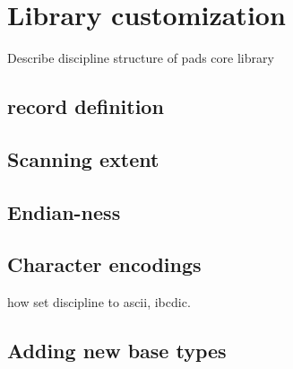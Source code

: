 \chapter{Library customization}
\label{chap:library-customization}
Describe discipline structure of pads core library
\section{record definition}

\section{Scanning extent}
\label{sec:library-customization-scanning-extent}

\section{Endian-ness}
\label{sec:library-customization-endian}

\section{Character encodings}
\label{sec:library-customization-character-encodings}
how set discipline to ascii, ibcdic.

\section{Adding new base types}
\label{sec:library-adding-new-base-types}
